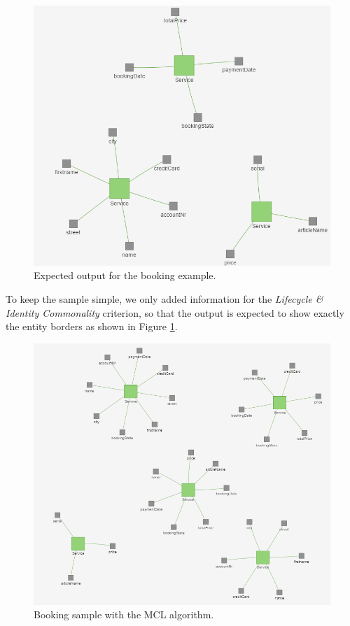 \begin{figure}[H]
	\begin{center}
		\includegraphics[scale=0.75]{images/booking_entities.png}
	\end{center}
	\caption{Expected output for the booking example.}
	\label{fig:bookingExample}
\end{figure}

To keep the sample simple, we only added information for the \textit{Lifecycle \& Identity Commonality} criterion, so that the output is expected to show exactly the entity borders as shown in Figure \ref{fig:bookingExample}.


\begin{figure}[H]
	\begin{center}
		\includegraphics[scale=0.7]{images/booking_entities_mcl.png}
	\end{center}
	\caption{Booking sample with the MCL algorithm.}
	\label{fig:bookingExampleMCL}
\end{figure}

